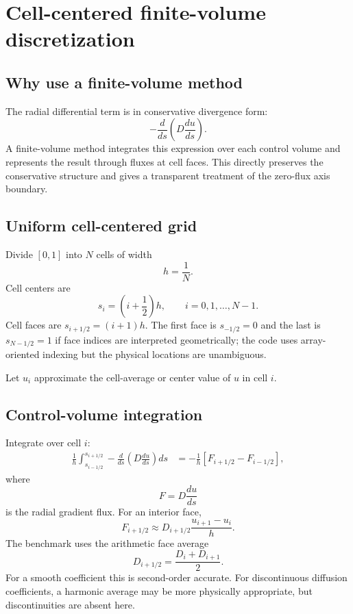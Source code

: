 \section{Cell-centered finite-volume discretization}
\label{sec:fvm}

\subsection{Why use a finite-volume method}
The radial differential term is in conservative divergence form:
\begin{equation}
-\frac{d}{ds}\left(D\frac{du}{ds}\right).
\end{equation}
A finite-volume method integrates this expression over each control volume and represents the result through fluxes at cell faces. This directly preserves the conservative structure and gives a transparent treatment of the zero-flux axis boundary.

\subsection{Uniform cell-centered grid}
Divide $[0,1]$ into $N$ cells of width
\begin{equation}
h=\frac{1}{N}.
\end{equation}
Cell centers are
\begin{equation}
s_i=\left(i+\frac{1}{2}\right)h,
\qquad i=0,1,\ldots,N-1.
\label{eq:cell_centers}
\end{equation}
Cell faces are $s_{i+1/2}=(i+1)h$. The first face is $s_{-1/2}=0$ and the last is $s_{N-1/2}=1$ if face indices are interpreted geometrically; the code uses array-oriented indexing but the physical locations are unambiguous.

Let $u_i$ approximate the cell-average or center value of $u$ in cell $i$.

\subsection{Control-volume integration}
Integrate over cell $i$:
\begin{align}
\frac{1}{h}\int_{s_{i-1/2}}^{s_{i+1/2}}
-\frac{d}{ds}\left(D\frac{du}{ds}\right)ds
&=-\frac{1}{h}\left[F_{i+1/2}-F_{i-1/2}\right],
\label{eq:fvm_balance}
\end{align}
where
\begin{equation}
F=D\frac{du}{ds}
\end{equation}
is the radial gradient flux. For an interior face,
\begin{equation}
F_{i+1/2}\approx D_{i+1/2}\frac{u_{i+1}-u_i}{h}.
\label{eq:interior_face_flux}
\end{equation}
The benchmark uses the arithmetic face average
\begin{equation}
D_{i+1/2}=\frac{D_i+D_{i+1}}{2}.
\label{eq:arithmetic_face_D}
\end{equation}
For a smooth coefficient this is second-order accurate. For discontinuous diffusion coefficients, a harmonic average may be more physically appropriate, but discontinuities are absent here.

